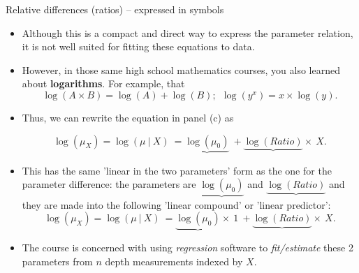 \documentclass[10pt,handout]{beamer}\usepackage[]{graphicx}\usepackage[]{color}
\begin{document}
		\begin{frame}[fragile]{Relative differences (ratios) -- expressed in symbols}
		
		\begin{itemize}
			\item Although this is a compact and direct way to express the parameter relation, it is not well suited for fitting these equations to data. 
	
	\item However, in those same  high school mathematics courses, you also learned about \textbf{logarithms}. For example, that 
	$$\log(A \times B) = \log(A) + \log(B); \ \  \log(y^x) = x \times \log(y).$$
	
	\item Thus, we can rewrite the equation in panel (c) as
	
	$$\log(\mu_X) = \log(\mu \ | \ X)  \ = \underbrace{\log(\mu_0)} \ +  \underbrace{\log(Ratio)} \times \ X.$$
	
	\item This has the same 'linear in the two parameters' form as the one for the parameter difference: the parameters are
	$\underbrace{\log(\mu_0)}$ and $\underbrace{\log(Ratio)}$ and they are made into the following 'linear compound' or 'linear predictor':
	$$\log(\mu_X) = \log(\mu \ | \ X)  \ = \underbrace{\log(\mu_0)} \times \ 1 \ + \underbrace{\log(Ratio)} \times \ X.$$
	
	\item The course is concerned with using \textit{regression} software to  \textit{fit/estimate} these 2 parameters from $n$ depth measurements indexed by $X$.

\end{itemize}
	
\end{frame}


\begin{frame}
\end{frame}
\end{document}
